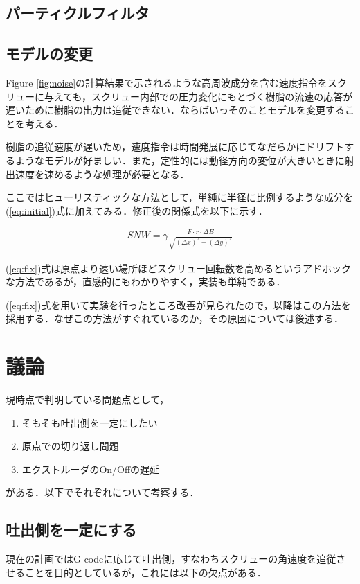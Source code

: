 \documentclass[twocolumn,oneside,a4paper]{article}
\begin{document}
\subsection{パーティクルフィルタ}



\subsection{モデルの変更}
Figure \ref{fig:noise}の計算結果で示されるような高周波成分を含む速度指令をスクリューに与えても，スクリュー内部での圧力変化にもとづく樹脂の流速の応答が遅いために樹脂の出力は追従できない．ならばいっそのことモデルを変更することを考える．

樹脂の追従速度が遅いため，速度指令は時間発展に応じてなだらかにドリフトするようなモデルが好ましい．また，定性的には動径方向の変位が大きいときに射出速度を速めるような処理が必要となる．

ここではヒューリスティックな方法として，単純に半径に比例するような成分を(\ref{eq:initial})式に加えてみる．修正後の関係式を以下に示す．

\begin{eqnarray}\label{eq:fix}
  SNW = \gamma \frac{F\cdot r\cdot  \Delta E}{\sqrt{(\Delta x)^2+(\Delta y)^2}}
\end{eqnarray}

(\ref{eq:fix})式は原点より遠い場所ほどスクリュー回転数を高めるというアドホックな方法であるが，直感的にもわかりやすく，実装も単純である．

(\ref{eq:fix})式を用いて実験を行ったところ改善が見られたので，以降はこの方法を採用する．なぜこの方法がすぐれているのか，その原因については後述する．

\section{議論}
現時点で判明している問題点として，

\begin{enumerate}
     \item そもそも吐出側を一定にしたい
     \item 原点での切り返し問題
     \item エクストルーダのOn/Offの遅延
\end{enumerate}

がある．以下でそれぞれについて考察する．

\subsection{吐出側を一定にする}
現在の計画ではG-codeに応じて吐出側，すなわちスクリューの角速度を追従させることを目的としているが，これには以下の欠点がある．
\end{document}
